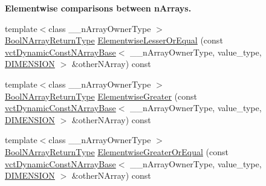 \begin{Indent}{\bf Elementwise comparisons between n\-Arrays.}
\begin{DoxyCompactItemize}
\item 
{\footnotesize template$<$class \-\_\-\-\_\-n\-Array\-Owner\-Type $>$ }\\\hyperlink{classvct_dynamic_const_n_array_base_a983f2b7edd51a896d447383b5a5af289}{Bool\-N\-Array\-Return\-Type} \hyperlink{classvct_dynamic_const_n_array_base_acff51e0574229f5daef41282e1006268}{Elementwise\-Lesser\-Or\-Equal} (const \hyperlink{classvct_dynamic_const_n_array_base}{vct\-Dynamic\-Const\-N\-Array\-Base}$<$ \-\_\-\-\_\-n\-Array\-Owner\-Type, value\-\_\-type, \hyperlink{classvct_dynamic_const_n_array_base_a815ac316ebc1bb2ab1969d307549826faf759c9ab831ff929b89af4ea2865a378}{D\-I\-M\-E\-N\-S\-I\-O\-N} $>$ \&other\-N\-Array) const 
\item 
{\footnotesize template$<$class \-\_\-\-\_\-n\-Array\-Owner\-Type $>$ }\\\hyperlink{classvct_dynamic_const_n_array_base_a983f2b7edd51a896d447383b5a5af289}{Bool\-N\-Array\-Return\-Type} \hyperlink{classvct_dynamic_const_n_array_base_a69a41e84d9bd4c2f46b2766780a97d82}{Elementwise\-Greater} (const \hyperlink{classvct_dynamic_const_n_array_base}{vct\-Dynamic\-Const\-N\-Array\-Base}$<$ \-\_\-\-\_\-n\-Array\-Owner\-Type, value\-\_\-type, \hyperlink{classvct_dynamic_const_n_array_base_a815ac316ebc1bb2ab1969d307549826faf759c9ab831ff929b89af4ea2865a378}{D\-I\-M\-E\-N\-S\-I\-O\-N} $>$ \&other\-N\-Array) const 
\item 
{\footnotesize template$<$class \-\_\-\-\_\-n\-Array\-Owner\-Type $>$ }\\\hyperlink{classvct_dynamic_const_n_array_base_a983f2b7edd51a896d447383b5a5af289}{Bool\-N\-Array\-Return\-Type} \hyperlink{classvct_dynamic_const_n_array_base_a9f9fde02f72d3f2619e80133f377ebe3}{Elementwise\-Greater\-Or\-Equal} (const \hyperlink{classvct_dynamic_const_n_array_base}{vct\-Dynamic\-Const\-N\-Array\-Base}$<$ \-\_\-\-\_\-n\-Array\-Owner\-Type, value\-\_\-type, \hyperlink{classvct_dynamic_const_n_array_base_a815ac316ebc1bb2ab1969d307549826faf759c9ab831ff929b89af4ea2865a378}{D\-I\-M\-E\-N\-S\-I\-O\-N} $>$ \&other\-N\-Array) const 
\end{DoxyCompactItemize}
\end{Indent}
